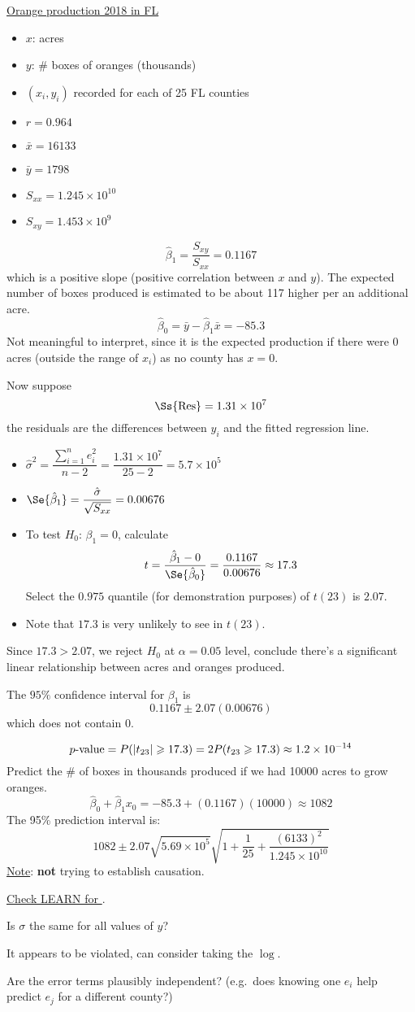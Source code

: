 \underline{Orange production 2018 in FL}
\begin{itemize}
    \item $ x $: acres
    \item $ y $: \# boxes of oranges (thousands)
    \item $ (x_i,y_i) $ recorded for each of 25 FL counties
    \item $ r=0.964 $
    \item $ \bar{x}=16133 $
    \item $ \bar{y}=1798 $
    \item $ S_{xx}=1.245\times 10^{10} $
    \item $ S_{xy}=1.453\times 10^9 $
\end{itemize}
\[ \hat{\beta}_1=\frac{S_{xy}}{S_{xx}}=0.1167 \]
which is a positive slope (positive correlation between $ x $ and $ y $).
The expected number of boxes produced is estimated to be about 117
higher per an additional acre.
\[ \hat{\beta}_0=\bar{y}-\hat{\beta}_1\bar{x}=-85.3 \]
Not meaningful to interpret, since it
is the expected production if there were 0 acres
(outside the range of $ x_i $) as no county has $ x=0 $.

Now suppose
\[ \Ss{\text{Res}}=1.31\times 10^7 \]
the residuals are the differences between $ y_i $ and the fitted regression
line.
\begin{itemize}
    \item $ \hat{\sigma}^2=\dfrac{\sum\limits_{i=1}^{n} e_i^2}{n-2}=
              \dfrac{1.31\times 10^7}{25-2}=5.7\times 10^5 $
    \item $ \Se{\hat{\beta}_1}=\dfrac{\hat{\sigma}}{\sqrt{S_{xx}}}=0.00676 $
    \item To test $ H_0 $: $ \beta_1 =0 $,
          calculate
          \[ t=\frac{\hat{\beta}_1-0}{\Se{\hat{\beta}_0}}=\frac{0.1167}{0.00676}
              \approx 17.3 \]
          Select the $ 0.975 $ quantile (for demonstration purposes) of $ t(23) $
          is $ 2.07 $.
    \item Note that $ 17.3 $ is very unlikely to see in $ t(23) $.
\end{itemize}
Since $ 17.3>2.07 $, we reject $ H_0 $ at $ \alpha=0.05 $
level, conclude there's a significant linear relationship between
acres and oranges produced.

The $ 95\% $ confidence interval for $ \beta_1 $ is
\[ 0.1167\pm 2.07(0.00676) \]
which does not contain $ 0 $.

\[ p\text{-value}=P(\lvert t_{23}\rvert\geqslant 17.3)=
    2P(t_{23}\geqslant 17.3)\approx 1.2\times 10^{-14} \]
Predict the \# of boxes in thousands produced if we had
10000 acres to grow oranges.
\[ \hat{\beta}_0+\hat{\beta}_1x_0=-85.3+(0.1167)(10000)\approx 1082 \]
The 95\% prediction interval is:
\[ 1082\pm 2.07\sqrt{5.69\times 10^5}\sqrt{1+\frac{1}{25}+
        \frac{(6133)^2}{1.245\times 10^{10}} } \]
\underline{Note}: \textbf{not} trying to establish causation.

\underline{Check LEARN for }.

Is $ \sigma $ the same for all values of $ y $?

It appears to be violated, can consider taking the $ \log $.

Are the error terms plausibly independent? (e.g.\
does knowing one $ e_i $ help predict $ e_j $
for a different county?)

